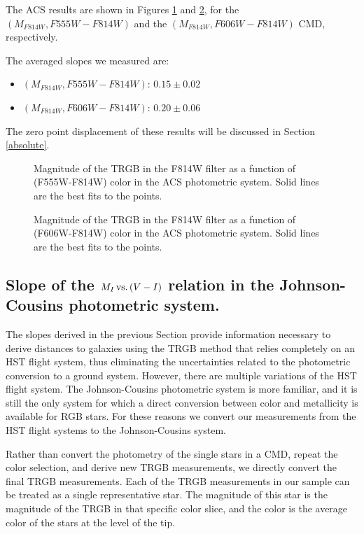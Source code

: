 \documentclass[11pt,preprint2]{aastex}
\newcommand{\slopefiveacs}{$0.15 \pm 0.02$}
\newcommand{\slopesixacs}{$0.20 \pm 0.06$}
\begin{document}
The ACS results are shown in Figures \ref{slope555_acs} and \ref{slope606_acs}, for the $(M_{F814W},F555W-F814W)$ and the $(M_{F814W},F606W-F814W)$  CMD, respectively.

The averaged slopes we measured are:

\begin{itemize}
\item $(M_{F814W},F555W-F814W)$: \slopefiveacs
\item $(M_{F814W},F606W-F814W)$: \slopesixacs
\end{itemize}
The zero point displacement of these results will be discussed in Section \ref{absolute}.

\begin{figure}
\caption{Magnitude of the TRGB in the F814W filter as a function of (F555W-F814W) color in the  ACS photometric system.  Solid lines are the best fits to the points.  \label{slope555_acs}}
\end{figure}

\begin{figure}
\caption{Magnitude of the TRGB in the F814W filter as a function of (F606W-F814W) color in the ACS photometric system.  Solid lines are the best fits to the points.  \label{slope606_acs}}
\end{figure}


\subsection{Slope of the $M_I\, {\rm vs.} \, (V-I)$ relation in the Johnson-Cousins photometric system.}
\label{JC}
The slopes derived in the previous Section provide information necessary to derive distances to galaxies using the TRGB method that relies completely on an HST flight system, thus eliminating the uncertainties related to the photometric conversion to a ground system. However, there are multiple variations of the HST flight system. The Johnson-Cousins photometric system is more familiar, and it is still the only system for which a direct conversion between color and metallicity is available for RGB stars. For these reasons we convert our measurements from the HST flight systems to the Johnson-Cousins system.

Rather than convert the photometry of the single stars in a CMD, repeat the color selection, and derive new TRGB measurements, we directly convert the final TRGB measurements. Each of the TRGB measurements in our sample can be treated as a single representative star. The magnitude of this star is the magnitude of the TRGB in that specific color slice, and the color is the average color of the stars at the level of the tip. 
\end{document}
